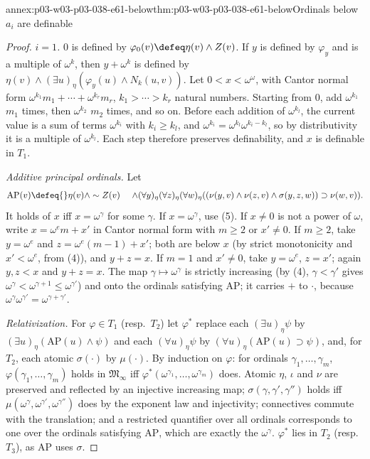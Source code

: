 \begin{annexitem}{annex:p03-w03-p03-038-e61-below}{thm:p03-w03-p03-038-e61-below}{Ordinals below \(a_i\) are definable}
\begin{proof}
\emph{\(i=1\).} \(0\) is defined by \(\varphi_0(v)\defeq\eta(v)\wedge
Z(v)\). If \(y\) is defined by \(\varphi_y\) and is a multiple of
\(\omega^k\), then \(y+\omega^k\) is defined by
\(\eta(v)\wedge(\exists u)_\eta(\varphi_y(u)\wedge N_k(u,v))\). Let
\(0<x<\omega^\omega\), with Cantor normal form
\(\omega^{k_1}m_1+\cdots+\omega^{k_r}m_r\), \(k_1>\cdots>k_r\) natural
numbers. Starting from \(0\), add \(\omega^{k_1}\) \(m_1\) times, then
\(\omega^{k_2}\) \(m_2\) times, and so on. Before each addition of
\(\omega^{k_l}\), the current value is a sum of terms \(\omega^{k_i}\)
with \(k_i\ge k_l\), and \(\omega^{k_i}=\omega^{k_l}\omega^{k_i-k_l}\), so
by distributivity it is a multiple of \(\omega^{k_l}\). Each step
therefore preserves definability, and \(x\) is definable in \(T_1\).

\emph{Additive principal ordinals.} Let
\[
\begin{aligned}
\mathrm{AP}(v)\defeq{}&\eta(v)\wedge\sim Z(v)\
&\wedge(\forall y)_\eta(\forall z)_\eta(\forall w)_\eta
((\nu(y,v)\wedge\nu(z,v)\wedge\sigma(y,z,w))\supset\nu(w,v)).
\end{aligned}
\]
It holds
of \(x\) iff \(x=\omega^\gamma\) for some \(\gamma\). If
\(x=\omega^\gamma\), use (5). If \(x\ne0\) is not a power of \(\omega\),
write \(x=\omega^em+x'\) in Cantor normal form with \(m\ge2\) or
\(x'\ne0\). If \(m\ge2\), take \(y=\omega^e\) and
\(z=\omega^e(m-1)+x'\); both are below \(x\) (by strict monotonicity and
\(x'<\omega^e\), from (4)), and \(y+z=x\). If \(m=1\) and \(x'\ne0\), take
\(y=\omega^e\), \(z=x'\); again \(y,z<x\) and \(y+z=x\). The map
\(\gamma\mapsto\omega^\gamma\) is strictly increasing (by (4),
\(\gamma<\gamma'\) gives \(\omega^\gamma<\omega^{\gamma+1}\le
\omega^{\gamma'}\)) and onto the ordinals satisfying \(\mathrm{AP}\); it
carries \(+\) to \(\cdot\), because
\(\omega^\gamma\omega^{\gamma'}=\omega^{\gamma+\gamma'}\).

\emph{Relativization.} For \(\varphi\in T_1\) (resp.\ \(T_2\)) let
\(\varphi^*\) replace each \((\exists u)_\eta\psi\) by
\((\exists u)_\eta(\mathrm{AP}(u)\wedge\psi)\) and each
\((\forall u)_\eta\psi\) by \((\forall u)_\eta(\mathrm{AP}(u)\supset\psi)\),
and, for \(T_2\), each atomic \(\sigma(\cdot)\) by \(\mu(\cdot)\). By
induction on \(\varphi\): for ordinals \(\gamma_1,\ldots,\gamma_m\),
\(\varphi(\gamma_1,\ldots,\gamma_m)\) holds in \(\mathfrak M_\infty\) iff
\(\varphi^*(\omega^{\gamma_1},\ldots,\omega^{\gamma_m})\) does. Atomic
\(\eta\), \(\iota\) and \(\nu\) are preserved and reflected by an
injective increasing map; \(\sigma(\gamma,\gamma',\gamma'')\) holds iff
\(\mu(\omega^\gamma,\omega^{\gamma'},\omega^{\gamma''})\) does by the
exponent law and injectivity; connectives commute with the translation;
and a restricted quantifier over all ordinals corresponds to one over the
ordinals satisfying \(\mathrm{AP}\), which are exactly the
\(\omega^\gamma\). \(\varphi^*\) lies in \(T_2\) (resp.\ \(T_3\)), as
\(\mathrm{AP}\) uses \(\sigma\).


\end{proof}
\end{annexitem}
